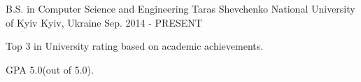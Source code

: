 

\begin{cventries}

  \cventry
    {B.S. in Computer Science and Engineering} %
    {Taras Shevchenko National University of Kyiv} %
    {Kyiv, Ukraine} %
    {Sep. 2014 - PRESENT} %
    {
      \begin{cvitems} %
        \item {Top 3 in University rating based on academic achievements.}
        \item {GPA 5.0(out of 5.0).}
      \end{cvitems}
    }

\end{cventries}
